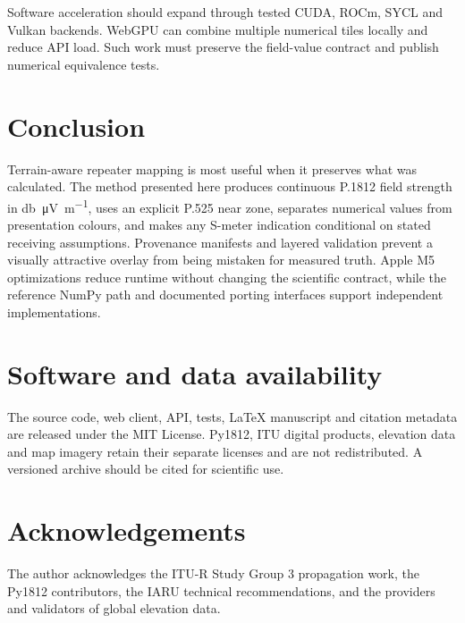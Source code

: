 \documentclass[10pt,a4paper,twocolumn]{article}
\begin{document}
Software acceleration should expand through tested CUDA, ROCm, SYCL and Vulkan
backends. WebGPU can combine multiple numerical tiles locally and reduce API
load. Such work must preserve the field-value contract and publish numerical
equivalence tests.

\section{Conclusion}

Terrain-aware repeater mapping is most useful when it preserves what was
calculated. The method presented here produces continuous P.1812 field strength
in \si{\decibel\micro\volt\per\meter}, uses an explicit P.525 near zone,
separates numerical values from presentation colours, and makes any S-meter
indication conditional on stated receiving assumptions. Provenance manifests
and layered validation prevent a visually attractive overlay from being
mistaken for measured truth. Apple M5 optimizations reduce runtime without
changing the scientific contract, while the reference NumPy path and documented
porting interfaces support independent implementations.

\section*{Software and data availability}

The source code, web client, API, tests, LaTeX manuscript and citation metadata
are released under the MIT License. Py1812, ITU digital products, elevation data
and map imagery retain their separate licenses and are not redistributed. A
versioned archive should be cited for scientific use.

\section*{Acknowledgements}

The author acknowledges the ITU-R Study Group 3 propagation work, the Py1812
contributors, the IARU technical recommendations, and the providers and
validators of global elevation data.



\end{document}
